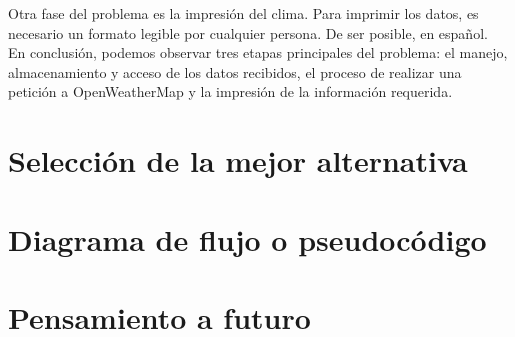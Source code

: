 \documentclass[]{article}
\begin{document}
Otra fase del problema es la impresión del clima. Para imprimir los datos, es 
necesario un formato legible por cualquier persona. De ser posible, en 
español.\\

En conclusión, podemos observar tres etapas principales del problema: 
el manejo, almacenamiento y acceso de los datos recibidos, el proceso de 
realizar una petición a OpenWeatherMap y la impresión de la información 
requerida.\\

\section{Selección de la mejor alternativa}
\section{Diagrama de flujo o pseudocódigo}

\section{Pensamiento a futuro}
\end{document}
